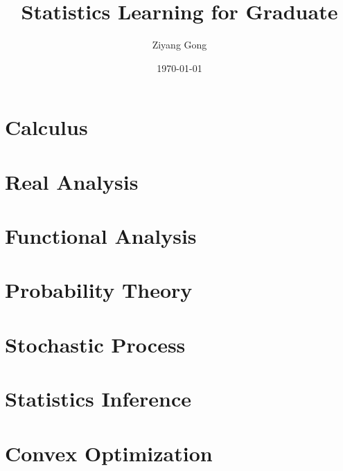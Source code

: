 \documentclass[pad,12pt,newtx]{elegantbook}
\title{Statistics Learning for Graduate}
\author{Ziyang Gong}
\date{\today}
\begin{document}
\maketitle
\tableofcontents
\mainmatter
\hypersetup{pageanchor=true}

\part{Calculus}




\part{Real Analysis}



\part{Functional Analysis}

\part{Probability Theory}






\part{Stochastic Process}




\part{Statistics Inference}






\part{Convex Optimization}





\appendix
\end{document}
